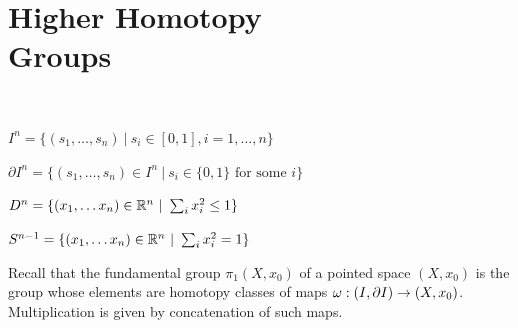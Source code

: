 

\chapter[Higher Homotopy Groups]{Higher Homotopy \\ Groups}
\label{HIGHER HOMOTOPY GROUPS CHAPTER}
\thispagestyle{firststyle}


\begin{notation}\ 
\benu
\item[] $I^{n} = \{(s_{1}, \dots, s_{n}) \ |\  s_{i}\in [0, 1], i=1, \dots, n \}$
\item[] $\partial I^{n} = \{(s_{1}, \dots, s_{n}) \in I^{n} \ |\  
s_{i}\in \{0, 1\} \text{ for some } i \}$
\item[] $D^{n} = \{(x_{1}, \dots x_{n})\in \R^{n} \ | \  \sum_{i}x^{2}_{i} \leq 1 \}$
\item[] $S^{n-1} = \{(x_{1}, \dots x_{n})\in {\mathbb R}^{n} \ | \  \sum_{i}x^{2}_{i} = 1 \}$
\eenu
\end{notation}


\vskip -3mm
Recall that the fundamental group $\pi_{1}(X, x_{0})$ of a pointed space $(X, x_{0})$
is the group whose elements are homotopy classes of maps $\omega: (I, {\partial I}) \to (X, x_{0})$. 
Multiplication is given by concatenation of such maps.

